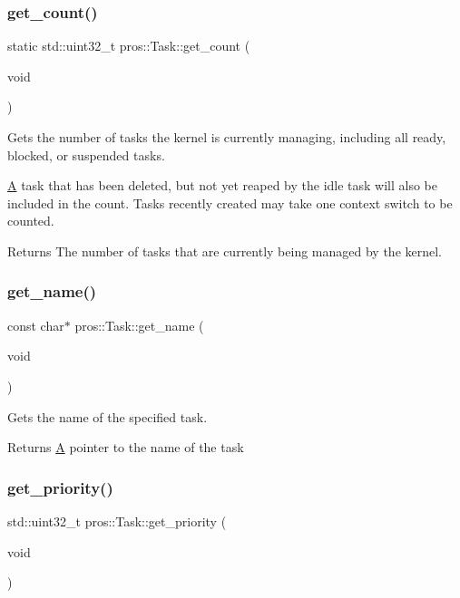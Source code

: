 \subsubsection{\texorpdfstring{get\_count()}{get\_count()}}
{\footnotesize\ttfamily static std\+::uint32\+\_\+t pros\+::\+Task\+::get\+\_\+count (\begin{DoxyParamCaption}\item[{void}]{ }\end{DoxyParamCaption})\hspace{0.3cm}{\ttfamily [static]}}



Gets the number of tasks the kernel is currently managing, including all ready, blocked, or suspended tasks. 

\mbox{\hyperlink{structA}{A}} task that has been deleted, but not yet reaped by the idle task will also be included in the count. Tasks recently created may take one context switch to be counted.

\begin{DoxyReturn}{Returns}
The number of tasks that are currently being managed by the kernel. 
\end{DoxyReturn}
\mbox{\label{classpros_1_1Task_a3c559d11cf602b99fc870b8be43fe191}} 
\subsubsection{\texorpdfstring{get\_name()}{get\_name()}}
{\footnotesize\ttfamily const char$\ast$ pros\+::\+Task\+::get\+\_\+name (\begin{DoxyParamCaption}\item[{void}]{ }\end{DoxyParamCaption})}



Gets the name of the specified task. 

\begin{DoxyReturn}{Returns}
\mbox{\hyperlink{structA}{A}} pointer to the name of the task 
\end{DoxyReturn}
\mbox{\label{classpros_1_1Task_a97e11478bd99181a664ed6e975fdb248}} 
\subsubsection{\texorpdfstring{get\_priority()}{get\_priority()}}
{\footnotesize\ttfamily std\+::uint32\+\_\+t pros\+::\+Task\+::get\+\_\+priority (\begin{DoxyParamCaption}\item[{void}]{ }\end{DoxyParamCaption})}



